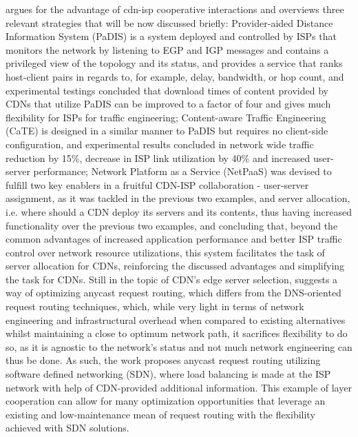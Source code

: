     \cite{cdn-isp-cooperations} argues for the advantage of cdn-isp cooperative interactions and overviews three relevant strategies that will be now discussed briefly: Provider-aided Distance Information System (PaDIS) \cite{pfa-10} is a system deployed and controlled by ISPs that monitors the network by listening to EGP and IGP messages and contains a privileged view of the topology and its status, and provides a service that ranks host-client pairs in regards to, for example, delay, bandwidth, or hop count, and experimental testings concluded that download times of content provided by CDNs that utilize PaDIS can be improved to a factor of four and gives much flexibility for ISPs for traffic engineering; Content-aware Traffic Engineering (CaTE) \cite{fps-12} is designed in a similar manner to PaDIS but requires no client-side configuration, and experimental results concluded in network wide traffic reduction by 15\%, decrease in ISP link utilization by 40\% and increased user-server performance; Network Platform as a Service (NetPaaS) \cite{fpl-13} was devised to fulfill two key enablers in a fruitful CDN-ISP collaboration - user-server assignment, as it was tackled in the previous two examples, and server allocation, i.e. where should a CDN deploy its servers and its contents, thus having increased functionality over the previous two examples, and concluding that, beyond the common advantages of increased application performance and better ISP traffic control over network resource utilizations, this system facilitates the task of server allocation for CDNs, reinforcing the discussed advantages and simplifying the task for CDNs.
    Still in the topic of CDN's edge server selection, \cite{wichtlhuber2017} suggests a way of optimizing anycast request routing, which differs from the DNS-oriented request routing techniques, which, while very light in terms of network engineering and infrastructural overhead when compared to existing alternatives whilst maintaining a close to optimum network path, it sacrifices flexibility to do so, as it is agnostic to the network's status and not much network engineering can thus be done.
    As such, the work proposes anycast request routing utilizing software defined networking (SDN), where load balancing is made at the ISP network with help of CDN-provided additional information.
    This example of layer cooperation can allow for many optimization opportunities that leverage an existing and low-maintenance mean of request routing with the flexibility achieved with SDN solutions.

